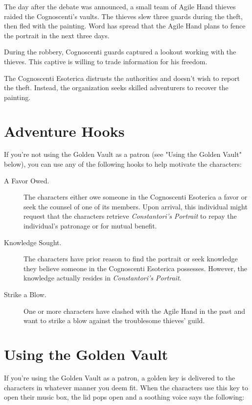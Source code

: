 \documentclass[10pt,a4paper,twoside,bg=print,twocolumn,openany,nodeprecatedcode]{dndbook}
\begin{document}
The day after the debate was announced, a small team of Agile Hand thieves raided the Cognoscenti's vaults. The thieves slew three guards during the theft, then fled with the painting. Word has spread that the Agile Hand plans to fence the portrait in the next three days.

During the robbery, Cognoscenti guards captured a lookout working with the thieves. This captive is willing to trade information for his freedom.

The Cognoscenti Esoterica distrusts the authorities and doesn't wish to report the theft. Instead, the organization seeks skilled adventurers to recover the painting.

\section{Adventure Hooks}
If you're not using the Golden Vault as a patron (see "Using the Golden Vault" below), you can use any of the following hooks to help motivate the characters:


\begin{description}
\item[A Favor Owed.]
The characters either owe someone in the Cognoscenti Esoterica a favor or seek the counsel of one of its members. Upon arrival, this individual might request that the characters retrieve \textit{Constantori's Portrait} to repay the individual's patronage or for mutual benefit.
\item[Knowledge Sought.]
The characters have prior reason to find the portrait or seek knowledge they believe someone in the Cognoscenti Esoterica possesses. However, the knowledge actually resides in \textit{Constantori's Portrait}.
\item[Strike a Blow.]
One or more characters have clashed with the Agile Hand in the past and want to strike a blow against the troublesome thieves' guild.
\end{description}

\section{Using the Golden Vault}
If you're using the Golden Vault as a patron, a golden key is delivered to the characters in whatever manner you deem fit. When the characters use this key to open their music box, the lid pops open and a soothing voice says the following:
\end{document}
